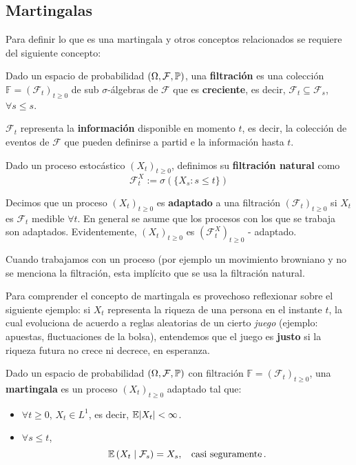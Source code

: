 \subsection{Martingalas}
Para definir lo que es una martingala y otros conceptos relacionados se requiere del siguiente concepto:
\begin{definition}[Filtración]
Dado un espacio de probabilidad $(\Omega, \mathcal{F}, \P)$, una \textbf{filtración} es una colección $\mathbb{F} = (\mathcal{F}_{t})_{t \geq 0}$ de sub $\sigma$-álgebras de $\mathcal{F}$ que es \textbf{creciente}, es decir, $\mathcal{F}_t \subseteq \mathcal{F}_s$, $\forall s \leq s$.
\end{definition}

$\mathcal{F}_t$ representa la \textbf{información} disponible en momento $t$, es decir, la colección de eventos de $\mathcal{F}$ que pueden definirse a partid e la información hasta $t$. 

\newp Dado un proceso estocástico $(X_t)_{t \geq 0}$, definimos su \textbf{filtración natural} como 
\begin{equation*}
        \mathcal{F}^{X}_t := \sigma\left( \{ X_s : s \leq t \}\right) 
\end{equation*}

\newp Decimos que un proceso $(X_{t})_{t \geq 0}$ es \textbf{adaptado} a una filtración $(\mathcal{F}_t)_{t \geq 0}$ 
si $X_t$ es $\mathcal{F}_t$ medible $\forall t$. En general se asume que los procesos con los que se trabaja son adaptados. Evidentemente, $(X_t)_{t \geq 0}$ es $(\mathcal{F}^X_t)_{t \geq 0}$ - adaptado.

\newp Cuando trabajamos con un proceso (por ejemplo un movimiento browniano y no se menciona la filtración, esta implícito que se usa la filtración natural. 

\newp Para comprender el concepto de martingala es provechoso reflexionar sobre el siguiente ejemplo: si $X_t$ representa la riqueza de una persona en el instante $t$, la cual evoluciona de acuerdo a reglas aleatorias de un cierto \textit{juego} (ejemplo: apuestas, fluctuaciones de la bolsa), entendemos que el juego es \textbf{justo} si la riqueza futura no crece ni decrece, en esperanza.
\begin{definition}[Martingala]
Dado un espacio de probabilidad $(\Omega, \mathcal{F}, \P)$ con filtración $\mathbb{F} = (\mathcal{F}_{t})_{t \geq 0}$, una \textbf{martingala} es un proceso $(X_t)_{t \geq 0}$ adaptado tal que:
\begin{itemize}
    \item $\forall  t \geq 0$, $X_t \in L^{1}$, es decir, $\E \abs{X_t} < \infty$.
    \item $\forall s \leq t$, 
            \begin{equation*}
                    \E \left( X_t \mid \mathcal{F}_s \right)  = X_s, \espacio \text{casi seguramente}\,.
            \end{equation*}
\end{itemize}
\end{definition}


